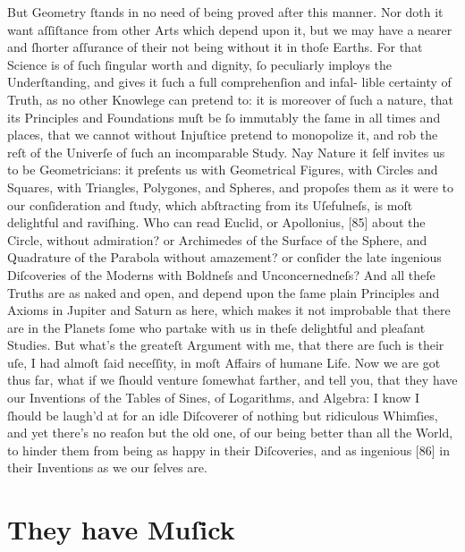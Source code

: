 \documentclass[letterpaper]{book}
\begin{document}
But Geometry ſtands in no need of being proved after this manner. Nor doth
it want aſſiſtance from other Arts which depend upon it, but we may have a
nearer and ſhorter aſſurance of their not being without it in thoſe Earths.
For that Science is of ſuch ſingular worth and dignity, ſo peculiarly
imploys the Underſtanding, and gives it ſuch a full comprehenſion and infal-
lible certainty of Truth, as no other Knowlege can pretend to: it is
moreover of ſuch a nature, that its Principles and Foundations muſt be ſo
immutably the ſame in all times and places, that we cannot without Injuſtice
pretend to monopolize it, and rob the reſt of the Univerſe of ſuch an
incomparable Study. Nay Nature it ſelf invites us to be Geometricians: it
preſents us with Geometrical Figures, with Circles and Squares, with
Triangles, Polygones, and Spheres, and propoſes them as it were to our
conſideration and ſtudy, which abſtracting from its Uſefulneſs, is moſt
delightful and raviſhing. Who can read Euclid, or Apollonius, [85] about
the Circle, without admiration? or Archimedes of the Surface of the Sphere,
and Quadrature of the Parabola without amazement? or conſider the late
ingenious Diſcoveries of the Moderns with Boldneſs and Unconcernedneſs? And
all theſe Truths are as naked and open, and depend upon the ſame plain
Principles and Axioms in Jupiter and Saturn as here, which makes it not
improbable that there are in the Planets ſome who partake with us in theſe
delightful and pleaſant Studies. But what's the greateſt Argument with me,
that there are ſuch is their uſe, I had almoſt ſaid neceſſity, in moſt
Affairs of humane Life.  Now we are got thus far, what if we ſhould venture
ſomewhat farther, and tell you, that they have our Inventions of the Tables
of Sines, of Logarithms, and Algebra: I know I ſhould be laugh'd at for an
idle Diſcoverer of nothing but ridiculous Whimſies, and yet there's no
reaſon but the old one, of our being better than all the World, to hinder
them from being as happy in their Diſcoveries, and as ingenious [86] in
their Inventions as we our ſelves are.


\section{They have Muſick}
\end{document}
